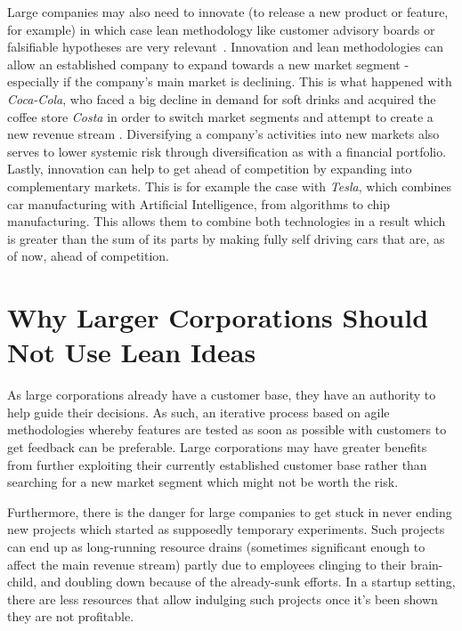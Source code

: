 \documentclass[conference]{IEEEtran}
\begin{document}
    Large companies may also need to innovate (to release a new product or feature, for example) in which
    case lean methodology like customer advisory boards or falsifiable hypotheses are very
    relevant~\cite{theLeanStartupBlog}.
    Innovation and lean methodologies can allow an established company to expand towards a new market segment - especially if the company's main market is declining. This is what happened with \textit{Coca-Cola}, who faced a big decline in demand for soft drinks and acquired the coffee store \textit{Costa} in order to switch market segments and attempt to create a new revenue stream \cite{coke}.
    Diversifying a company's activities into new markets also serves to lower systemic risk through diversification as with a financial portfolio. Lastly, innovation can help to get ahead of competition by expanding into complementary markets. This is for example the case with \textit{Tesla}, which combines car manufacturing with Artificial Intelligence, from algorithms to chip manufacturing. This allows them to combine both technologies in a result which is greater than the sum of its parts by making fully self driving cars that are, as of now, ahead of competition.

    \section{Why Larger Corporations Should Not Use Lean Ideas}

    As large corporations already have a customer base, they have an authority to help guide their decisions. As such, an iterative process based on agile methodologies whereby features are tested as soon as possible with customers to get feedback can be preferable. Large corporations may have greater benefits from further exploiting their currently established customer base rather than searching for a new market segment which might not be worth the risk.

    Furthermore, there is the danger for large companies to get stuck in never ending new projects which started as supposedly temporary experiments.
    Such projects can end up as long-running resource drains (sometimes significant enough to affect the main revenue stream) partly due to employees clinging to their brain-child, and doubling down because of the already-sunk efforts.
    In a startup setting, there are less resources that allow indulging such projects once it's been shown they are not profitable.
\end{document}
